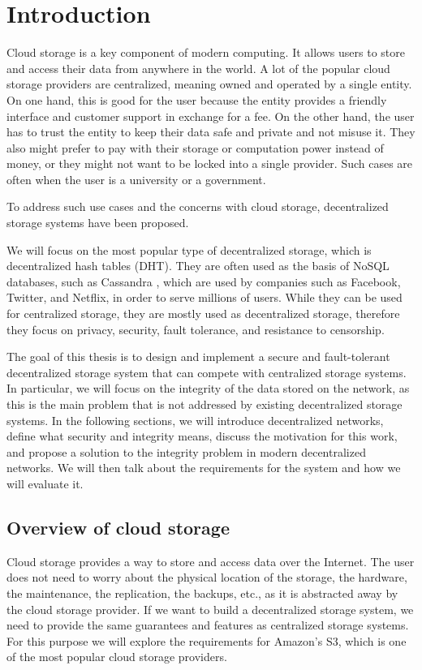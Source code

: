 \label{chapter:introduction}
\chapter{Introduction}

Cloud storage is a key component of modern computing.
It allows users to store and access their data from anywhere in the world.
A lot of the popular cloud storage providers are centralized, meaning owned and operated by a single entity.
On one hand, this is good for the user because the entity provides a friendly interface and customer support
in exchange for a fee.
On the other hand, the user has to trust the entity to keep their data safe and private and not misuse it.
They also might prefer to pay with their storage or computation power instead of money, or 
they might not want to be locked into a single provider.
Such cases are often when the user is a university or a government.

To address such use cases and the concerns with cloud storage, decentralized storage systems have been proposed.

We will focus on the most popular type of decentralized storage, which is decentralized hash tables (DHT).
They are often used as the basis of NoSQL databases, such as Cassandra \cite{cassandra},
which are used by companies such as Facebook, Twitter, and Netflix, in order to serve millions of users.
While they can be used for centralized storage, they are mostly used as decentralized storage,
therefore they focus on privacy, security, fault tolerance, and resistance to censorship.

The goal of this thesis is to design and implement a secure and fault-tolerant decentralized storage system
that can compete with centralized storage systems.
In particular, we will focus on the integrity of the data stored on the network,
as this is the main problem that is not addressed by existing decentralized storage systems.
In the following sections, we will introduce decentralized networks,
define what security and integrity means, discuss the motivation for this work,
and propose a solution to the integrity problem in modern decentralized networks.
We will then talk about the requirements for the system and how we will evaluate it.

\section{Overview of cloud storage}

Cloud storage provides a way to store and access data over the Internet.
The user does not need to worry about the physical location of the storage, the hardware, the maintenance,
the replication, the backups, etc., as it is abstracted away by the cloud storage provider.
If we want to build a decentralized storage system, we need to provide the same guarantees and features
as centralized storage systems.
For this purpose we will explore the requirements for Amazon's S3,
which is one of the most popular cloud storage providers.

